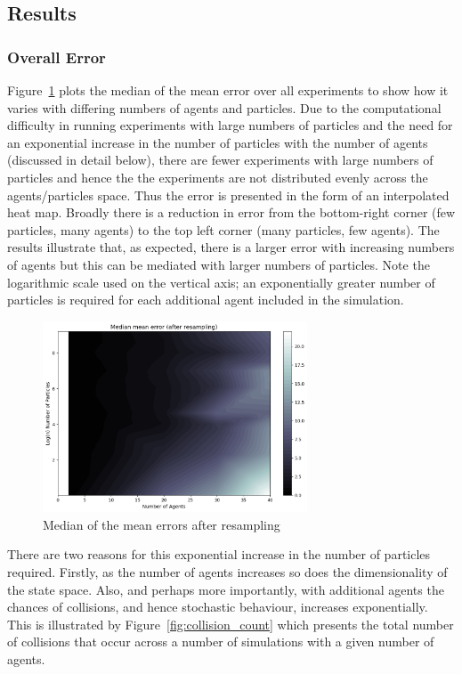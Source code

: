 \subsection{Results}

\subsubsection{Overall Error}

Figure~\ref{fig:median_abs_error} plots the median of the mean error over all experiments to show how it varies with differing numbers of agents and particles. Due to the computational difficulty in running experiments with large numbers of particles and the need for an exponential increase in the number of particles with the number of agents (discussed in detail below), there are fewer experiments with large numbers of particles and hence the the experiments are not distributed evenly across the agents/particles space. Thus the error is presented in the form of an interpolated heat map. Broadly there is a reduction in error from the bottom-right corner (few particles, many agents) to the top left corner (many particles, few agents). The results illustrate that, as expected, there is a larger error with increasing numbers of agents but this can be mediated with larger numbers of particles. Note the logarithmic scale used on the vertical axis; an exponentially greater number of particles is required for each additional agent included in the simulation. 

\begin{figure}[ht]
	\centering
	\includegraphics[width=0.7\textwidth]{figures/results/median_abs_error}
	\caption{Median of the mean errors after resampling} \label{fig:median_abs_error}
\end{figure}

There are two reasons for this exponential increase in the number of particles required. Firstly, as the number of agents increases so does the dimensionality of the state space. Also, and perhaps more importantly, with additional agents the chances of collisions, and hence stochastic behaviour, increases exponentially. This is illustrated by Figure~\ref{fig:collision_count} which presents the total number of collisions that occur across a number of simulations with a given number of agents.

